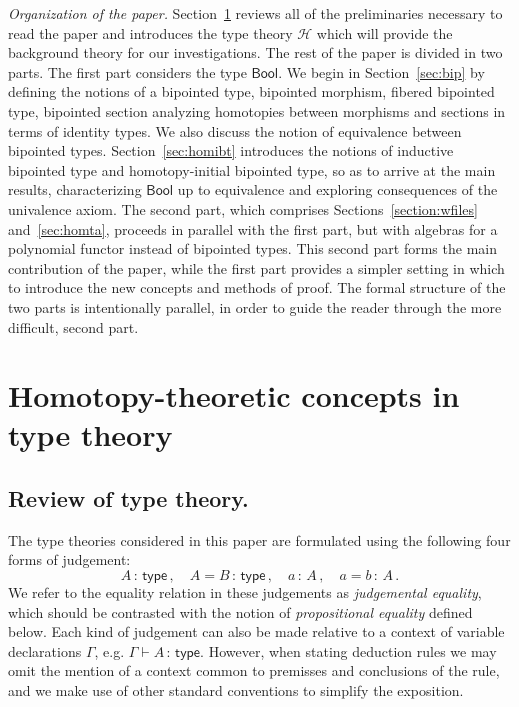\documentclass[10pt,a4paper,oneside,reqno]{amsart}
\numberwithin{equation}{section}
\theoremstyle{mythm}
\theoremstyle{mydef}
\theoremstyle{myrmk}
\newcommand{\deq}{=}
\newcommand{\co}{\,{:}\,}
\newcommand{\type}{\mathsf{type}}
\newcommand{\Hint}{\mathcal{H}}
\newcommand{\Bool}{\mathsf{Bool}}
\begin{document}
\noindent
\emph{Organization of the paper.} Section~\ref{sec:bac} reviews all of the  preliminaries necessary to
read the paper and introduces the type theory $\Hint$ which will provide the background theory for
our investigations. The rest of the paper is divided in two parts. The first part considers the type $\Bool$.
We begin in Section~\ref{sec:bip} by defining the notions of a bipointed type, bipointed morphism,
fibered bipointed type, bipointed section analyzing homotopies between morphisms and 
sections in terms of identity types. We also discuss the notion of equivalence between bipointed types.
Section~\ref{sec:homibt} introduces the notions of inductive bipointed type and homotopy-initial
bipointed type, so as to arrive at the main results, characterizing $\Bool$ up to equivalence and
exploring consequences of the univalence axiom. The second part, which comprises
Sections~\ref{section:wfiles} and~\ref{sec:homta}, proceeds in parallel with the 
first part, but with algebras for a polynomial functor instead of bipointed types. 
This second part forms the main contribution of the paper, while the first part provides a simpler setting in which to introduce the new concepts and methods of proof.  The formal structure of the two parts is intentionally parallel, in order to guide the reader through the more difficult, second part.


\section{Homotopy-theoretic concepts in type theory}
\label{sec:bac}


\subsection*{Review of type theory.} The type theories considered in this paper are formulated using the 
following four forms of judgement:
\[
A \co \type \, , \quad A \deq B \co \type \, , \quad   a \co A \, , \quad a \deq b \co A \, . 
\]
We refer to the equality relation in these judgements as \emph{judgemental equality}, 
which should be contrasted with the notion of \emph{propositional equality}
defined below. 
Each kind of judgement can also be made relative to a context of variable declarations $\Gamma$, e.g. $\Gamma \vdash A \co \type$. However, when stating deduction rules we may omit the mention
of a context common to premisses and conclusions of the rule, and we
make use of other standard conventions to simplify the exposition.
\end{document}
